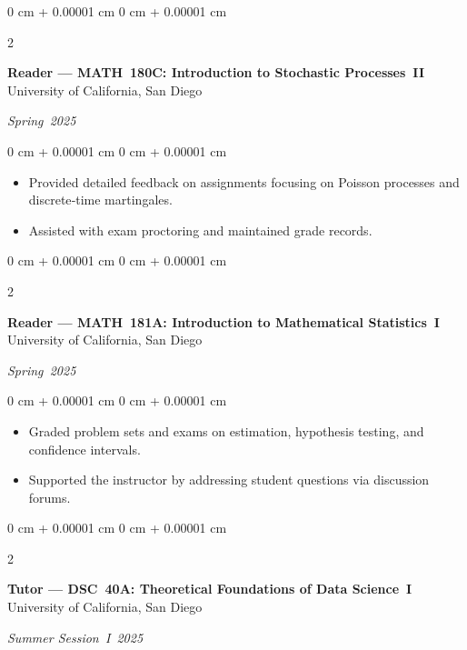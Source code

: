 \documentclass[10pt, letterpaper]{article}
\newenvironment{highlights}{
    \begin{itemize}[
        topsep=0.10 cm,
        parsep=0.10 cm,
        partopsep=0pt,
        itemsep=0pt,
        leftmargin=0 cm + 10pt
    ]
}{
    \end{itemize}
} %
\newenvironment{onecolentry}{
    \begin{adjustwidth}{
        0 cm + 0.00001 cm
    }{
        0 cm + 0.00001 cm
    }
}{
    \end{adjustwidth}
} %
\newenvironment{twocolentry}[2][]{
    \onecolentry
    \def\secondColumn{#2}
    \setcolumnwidth{\fill, 4.5 cm}
    \begin{paracol}{2}
}{
    \switchcolumn \raggedleft \secondColumn
    \end{paracol}
    \endonecolentry
} %
\begin{document}
    \vspace{0.15 cm}

    \begin{twocolentry}{\textit{Spring 2025}}
        \textbf{Reader — MATH 180C: Introduction to Stochastic Processes II} \\
        University of California, San Diego
    \end{twocolentry}

    \vspace{0.10 cm}
    \begin{onecolentry}
        \begin{highlights}
            \item Provided detailed feedback on assignments focusing on Poisson processes and discrete‑time martingales.
            \item Assisted with exam proctoring and maintained grade records.
        \end{highlights}
    \end{onecolentry}

    \vspace{0.15 cm}

    \begin{twocolentry}{\textit{Spring 2025}}
        \textbf{Reader — MATH 181A: Introduction to Mathematical Statistics I} \\
        University of California, San Diego
    \end{twocolentry}

    \vspace{0.10 cm}
    \begin{onecolentry}
        \begin{highlights}
            \item Graded problem sets and exams on estimation, hypothesis testing, and confidence intervals.
            \item Supported the instructor by addressing student questions via discussion forums.
        \end{highlights}
    \end{onecolentry}

    \vspace{0.15 cm}

    \begin{twocolentry}{\textit{Summer Session I 2025}}
        \textbf{Tutor — DSC 40A: Theoretical Foundations of Data Science I} \\
        University of California, San Diego
    \end{twocolentry}
\end{document}
